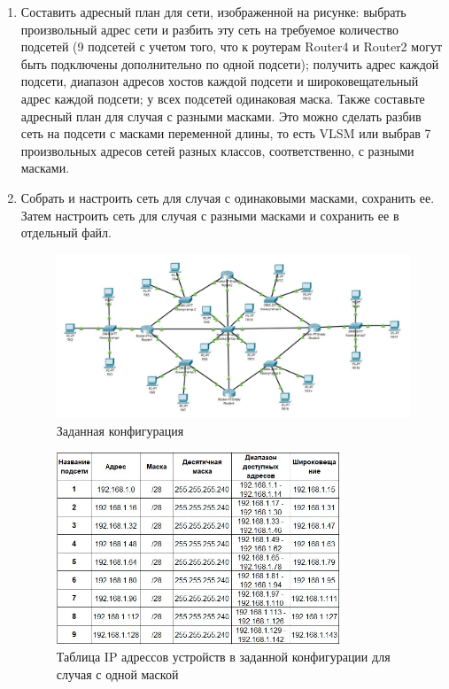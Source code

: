\documentclass[bachelor, och, labwork]{shiza}
\begin{document}


\begin{enumerate}
    
    \item Составить адресный план для сети, изображенной на рисунке: выбрать произвольный адрес сети и разбить 
    эту сеть на требуемое количество подсетей (9 подсетей с учетом того, что к роутерам Router4 и Router2 могут 
    быть подключены дополнительно по одной подсети); получить адрес каждой подсети, диапазон адресов хостов каждой 
    подсети и широковещательный адрес каждой подсети; у всех подсетей одинаковая маска. Также составьте адресный 
    план для случая с разными масками. Это можно сделать разбив сеть на подсети с масками переменной длины, то есть 
    VLSM или выбрав 7 произвольных адресов сетей разных классов, соответственно, с разными масками.
    
    \item Собрать и настроить сеть для случая с одинаковыми масками, сохранить ее. Затем настроить сеть для случая с 
    разными масками и сохранить ее в отдельный файл.
    
    \begin{figure}[H]
        \centering      %
        \includegraphics[width=1.\textwidth]{1}
        \caption{Заданная конфигурация}
        \label{fig:image1}
    \end{figure}

    \begin{figure}[H]
        \centering      %
        \includegraphics[width=0.8\textwidth]{2}
        \caption{Таблица IP адрессов устройств в заданной конфигурации для случая с одной маской}
        \label{fig:image1}
    \end{figure}


\end{enumerate}
\end{document}
